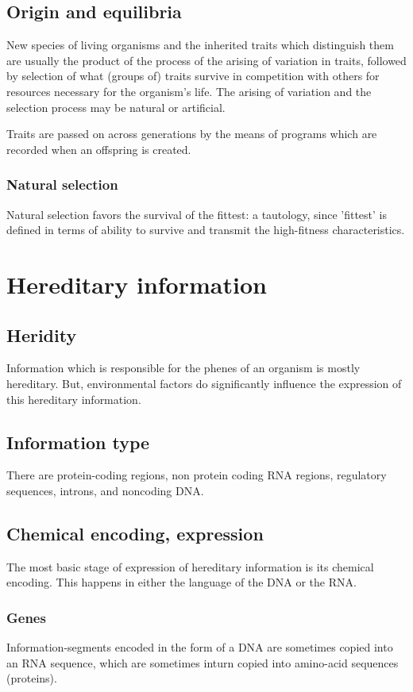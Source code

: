 \documentclass[oneside, article]{memoir}
\begin{document}
\section{Origin and equilibria}
New species of living organisms and the inherited traits which distinguish them are usually the product of the process of the arising of variation in traits, followed by selection of what (groups of) traits survive in competition with others for resources necessary for the organism's life. The arising of variation and the selection process may be natural or artificial.

Traits are passed on across generations by the means of programs which are recorded when an offspring is created.

\subsection{Natural selection}
Natural selection favors the survival of the fittest: a tautology, since 'fittest' is defined in terms of ability to survive and transmit the high-fitness characteristics.

\chapter{Hereditary information}
\section{Heridity}
Information which is responsible for the phenes of an organism is mostly hereditary. But, environmental factors do significantly influence the expression of this hereditary information.

\section{Information type}
There are protein-coding regions, non protein coding RNA regions, regulatory sequences, introns, and noncoding DNA.


\section{Chemical encoding, expression}
The most basic stage of expression of hereditary information is its chemical encoding. This happens in either the language of the DNA or the RNA.

\subsection{Genes}
Information-segments encoded in the form of a DNA are sometimes copied into an RNA sequence, which are sometimes inturn copied into amino-acid sequences (proteins).
\end{document}
